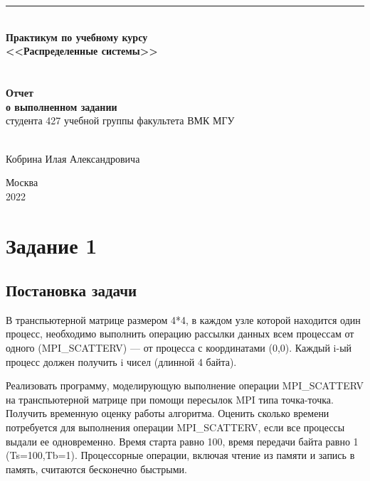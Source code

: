 \documentclass[a4paper,12pt,titlepage,finall]{article}
\begin{document}
\begin{titlepage}
\begin{center}
\begin{minipage}{0.10\textwidth}
      \end{minipage}\\
      ~\\
      \par\noindent\rule{\textwidth}{0.1pt}
    \vfill
    ~\\
    {\large \bf
      Практикум по учебному курсу\\
      <<Распределенные системы>>\\
    }
    ~\\
    ~\\
    {\large \bf
      Отчет\\
      о выполненном задании
    }\\
    {\large
      студента 427 учебной группы факультета ВМК МГУ
    }\\
    ~\\
    {\small
      Кобрина Илая Александровича
      \begin{center}
      \end{center}
    }
  \end{center}
  \begin{center}
    \vfill
    {\small Москва\\2022}
  \end{center}
\end{titlepage}



\tableofcontents
\newpage
\section{Задание 1}
\subsection{Постановка задачи}
В транспьютерной матрице размером 4*4, в каждом узле которой находится один
процесс, необходимо выполнить операцию рассылки данных всем процессам от одного
(MPI\_SCATTERV) --- от процесса с координатами (0,0). Каждый i-ый процесс должен получить i чисел (длинной 4 байта).

Реализовать программу, моделирующую выполнение операции MPI\_SCATTERV на транспьютерной матрице при помощи пересылок MPI типа точка-точка.
Получить временную оценку работы алгоритма. Оценить сколько времени потребуется
для выполнения операции MPI\_SCATTERV, если все процессы выдали ее одновременно. Время старта равно 100, время передачи байта равно 1 (Ts=100,Tb=1). Процессорные операции, включая чтение из памяти и запись в память, считаются бесконечно быстрыми.
\end{document}
